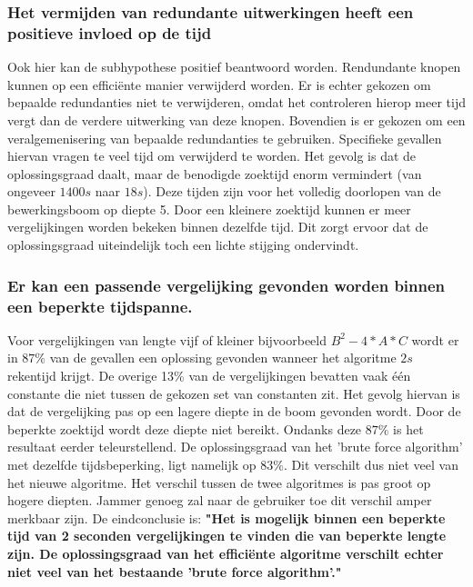 \documentclass[Main.tex]{subfiles}
\begin{document}
\subsubsection{Het vermijden van redundante uitwerkingen heeft een positieve invloed op de tijd}
Ook hier kan de subhypothese positief beantwoord worden. Rendundante knopen kunnen op een effici\"ente manier verwijderd worden. Er is echter gekozen om bepaalde redundanties niet te verwijderen, omdat het controleren hierop meer tijd vergt dan de verdere uitwerking van deze knopen. Bovendien is er gekozen om een veralgemenisering van bepaalde redundanties te gebruiken. Specifieke gevallen hiervan vragen te veel tijd om verwijderd te worden. Het gevolg is dat de oplossingsgraad daalt, maar de benodigde zoektijd enorm vermindert (van ongeveer $1400s$ naar $18s$). Deze tijden zijn voor het volledig doorlopen van de bewerkingsboom op diepte 5. Door een kleinere zoektijd kunnen er meer vergelijkingen worden bekeken binnen dezelfde tijd. Dit zorgt ervoor dat de oplossingsgraad uiteindelijk toch een lichte stijging ondervindt.

\subsubsection{Er kan een passende vergelijking gevonden worden binnen een beperkte tijdspanne.}
Voor vergelijkingen van lengte vijf of kleiner bijvoorbeeld $B^{2} - 4 \ast A \ast C$ wordt er in $87\%$ van de gevallen een oplossing gevonden wanneer het algoritme $2s$ rekentijd krijgt. De overige 13\% van de vergelijkingen bevatten vaak \'e\'en constante die niet tussen de gekozen set van constanten zit. Het gevolg hiervan is dat de vergelijking pas op een lagere diepte in de boom gevonden wordt. Door de beperkte zoektijd wordt deze diepte niet bereikt. Ondanks deze $87\%$ is het resultaat eerder teleurstellend. De oplossingsgraad van het 'brute force algorithm' met dezelfde tijdsbeperking, ligt namelijk op $83\%$. Dit verschilt dus niet veel van het nieuwe algoritme. Het verschil tussen de twee algoritmes is pas groot op hogere diepten. Jammer genoeg zal naar de gebruiker toe dit verschil amper merkbaar zijn. De eindconclusie is: \textbf{"Het is mogelijk binnen een beperkte tijd van 2 seconden vergelijkingen te vinden die van beperkte lengte zijn. De oplossingsgraad van het effici\"ente algoritme verschilt echter niet veel van het bestaande 'brute force algorithm'."}
\end{document}

